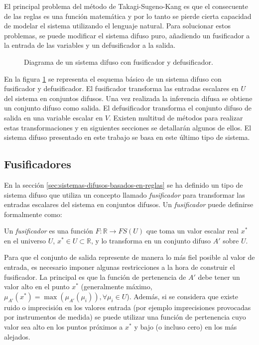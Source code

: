 El principal problema del método de Takagi-Sugeno-Kang es que el consecuente de las reglas es una función matemática y por lo tanto se pierde cierta capacidad de modelar el sistema utilizando el lenguaje natural. Para solucionar estos problemas, se puede modificar el sistema difuso puro, añadiendo un fusificador a la entrada de las variables y un defusificador a la salida.

\begin{figure}[tb]
	\centering
	
	\caption{Diagrama de un sistema difuso con fusificador y defusificador.}
	\label{fig:fuzzy-system}
\end{figure}

En la figura \ref{fig:fuzzy-system} se representa el esquema básico de un sistema difuso con fusificador y defusificador. El fusificador transforma las entradas escalares en $U$ del sistema en conjuntos difusos. Una vez realizada la inferencia difusa se obtiene un conjunto difuso como salida. El defusificador transforma el conjunto difuso de salida en una variable escalar en $V$. Existen multitud de métodos para realizar estas transformaciones y en siguientes secciones se detallarán algunos de ellos. El sistema difuso presentado en este trabajo se basa en este último tipo de sistema.

\subsection{Fusificadores}\label{sec:fusificadores}

En la sección \ref{sec:sistemas-difusos-basados-en-reglas} se ha definido un tipo de sistema difuso que utiliza un concepto llamado \emph{fusificador} para transformar las entradas escalares del sistema en conjuntos difusos. Un \emph{fusificador} puede definirse formalmente como:

\begin{definition}\label{def:fusificador}
Un \emph{fusificador} es una función $F:\mathbb{R} \rightarrow FS(U)$ que toma un valor escalar real $x^{*}$ en el universo $U$, $x^{*}\in U \subset \mathbb{R}$, y lo transforma en un conjunto difuso $A'$ sobre $U$.
\end{definition}

Para que el conjunto de salida represente de manera lo más fiel posible al valor de entrada, es necesario imponer algunas restricciones a la hora de construir el fusificador. La principal es que la función de pertenencia de $A'$ debe tener un valor alto en el punto $x^*$ (generalmente máximo, $\mu_{A'}(x^*) = \max(\mu_{A'}(\mu_{i})),\forall \mu_{i} \in U$). Además, si se considera que existe ruido o imprecisión en los valores entrada (por ejemplo imprecisiones provocadas por instrumentos de medida) se puede utilizar una función de pertenencia cuyo valor sea alto en los puntos próximos a $x^*$ y bajo (o incluso cero) en los más alejados.

